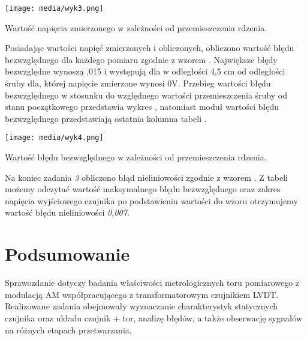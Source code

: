\documentclass{article}
\begin{document}
\begin{graph}[ht]
    \centering
    \texttt{[image: media/wyk3.png]}
    \caption{Wartość napięcia zmierzonego w zależności od przemieszczenia rdzenia.}
    \label{wyk3}
\end{graph}
\newpage
Posiadając wartości napięć zmierzonych i obliczonych, obliczono wartość błędu bezwzględnego dla każdego pomiaru zgodnie z wzorem . Największe błędy bezwzględne wynoszą ,015 i występują dla w odległości 4,5 cm od odległości śruby dla, której napięcie zmierzone wynosi 0V. Przebieg wartości błędu bezwzględnego w stosunku do względnego wartości przemieszczenia śruby od stanu początkowego przedstawia wykres , natomiast moduł wartości błędu bezwzględnego przedstawiają ostatnia kolumna tabeli .

\begin{graph}[ht]
    \centering
    \texttt{[image: media/wyk4.png]}
    \caption{Wartość błędu bezwzględnego w zależności od przemieszczenia rdzenia.}
    \label{wyk4}
\end{graph}
Na koniec zadania \textit{3} obliczono błąd nieliniowości zgodnie z wzorem . Z tabeli możemy odczytać wartość maksymalnego błędu bezwzględnego oraz zakres napięcia wyjściowego czujnika po podstawieniu wartości do wzoru otrzymujemy wartość błędu nieliniowości \textit{0,007}.
\newpage

\section{Podsumowanie}
Sprawozdanie dotyczy badania właściwości metrologicznych toru pomiarowego z modulacją AM współpracującego z transformatorowym czujnikiem LVDT. Realizowane zadania obejmowały wyznaczanie charakterystyk statycznych czujnika oraz układu czujnik + tor, analizę błędów, a także obserwację sygnałów na różnych etapach przetwarzania.
\end{document}
